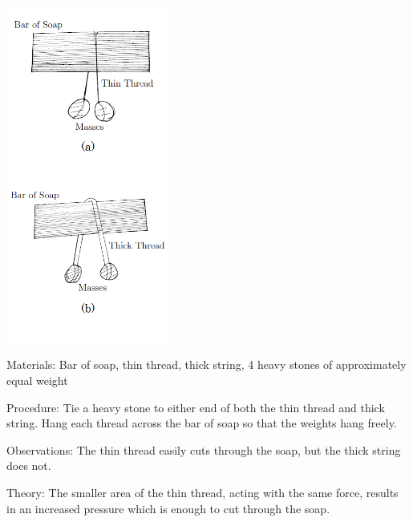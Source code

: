 \begin{multicols}{2}
\begin{center}
\includegraphics[width=0.4\textwidth]{./img/pressure-solids.png}
\end{center}

\begin{description*}
\item[Materials:]{Bar of soap, thin thread, thick string, 4 heavy stones of approximately equal weight}
\item[Procedure:]{Tie a heavy stone to either end of both the thin thread and thick string. Hang each thread across the bar of soap so that the weights hang freely.}
\item[Observations:]{The thin thread easily cuts through the soap, but the thick string does not.}
\item[Theory:]{The smaller area of the thin thread, acting with the same force, results in an increased pressure which is enough to cut through the soap.}
\end{description*}

\vfill
\columnbreak



\end{multicols}
